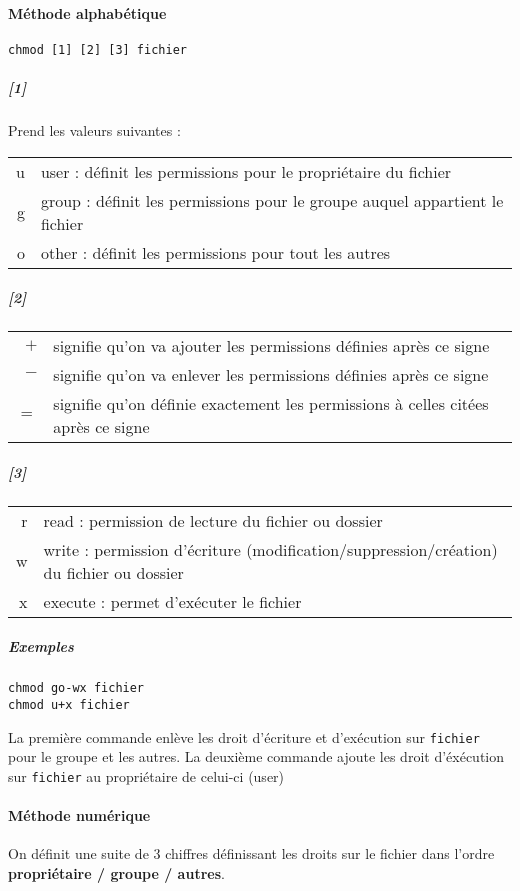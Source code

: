 \documentclass[a4paper,twoside]{article}
\begin{document}
\paragraph{Méthode alphabétique}
\verb|chmod [1] [2] [3] fichier|
\subparagraph{[1]}
Prend les valeurs suivantes :
\begin{center}
\begin{tabular}{rl}
u & user : définit les permissions pour le propriétaire du fichier\\
g & group : définit les permissions pour le groupe auquel appartient le fichier\\
o & other : définit les permissions pour tout les autres
\end{tabular}
\end{center}

\subparagraph{[2]}
\begin{tabular}{rl}
$+$ & signifie qu'on va ajouter les permissions définies après ce signe\\
$-$ & signifie qu'on va enlever les permissions définies après ce signe\\
$=$ & signifie qu'on définie exactement les permissions à celles citées après ce signe
\end{tabular}

\subparagraph{[3]}

\begin{tabular}{rl}
r & read : permission de lecture du fichier ou dossier\\
w & write : permission d'écriture (modification/suppression/création) du fichier ou dossier\\
x & execute : permet d'exécuter le fichier
\end{tabular}

\subparagraph{Exemples}

\begin{verbatim}
chmod go-wx fichier
chmod u+x fichier
\end{verbatim}

La première commande enlève les droit d'écriture et d'exécution sur \texttt{fichier} pour le groupe et les autres. La deuxième commande ajoute les droit d'éxécution sur \texttt{fichier} au propriétaire de celui-ci (user)

\paragraph{Méthode numérique}
On définit une suite de 3 chiffres définissant les droits sur le fichier dans l'ordre \textbf{propriétaire / groupe / autres}.
\end{document}
